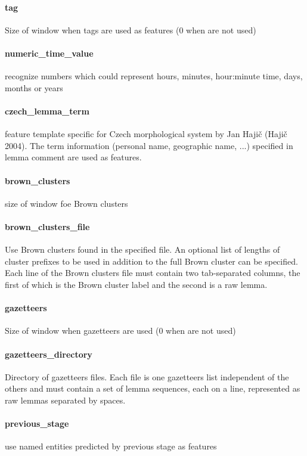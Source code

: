 \documentclass[12pt,a4paper]{report}
\begin{document}
\paragraph{tag}
Size of window when tags are used as features (0 when are not used)

\paragraph{numeric\_time\_value}
recognize numbers which could represent hours, minutes, hour:minute time, days, months or years

\paragraph{czech\_lemma\_term}
feature template specific for Czech morphological system by Jan Hajič (Hajič 2004). The term information (personal name, geographic name, ...) specified in lemma comment are used as features.

\paragraph{brown\_clusters}size of window foe Brown clusters 

\paragraph{brown\_clusters\_file}
Use Brown clusters found in the specified file. An optional list of lengths of cluster prefixes to be used in addition to the full Brown cluster can be specified. Each line of the Brown clusters file must contain two tab-separated columns, the first of which is the Brown cluster label and the second is a raw lemma.

\paragraph{gazetteers}
Size of window when gazetteers are used (0 when are not used)

\paragraph{gazetteers\_directory}
Directory of gazetteers files. Each file is one gazetteers list independent of the others and must contain a set of lemma sequences, each on a line, represented as raw lemmas separated by spaces.

\paragraph{previous\_stage}
use named entities predicted by previous stage as features
\end{document}
